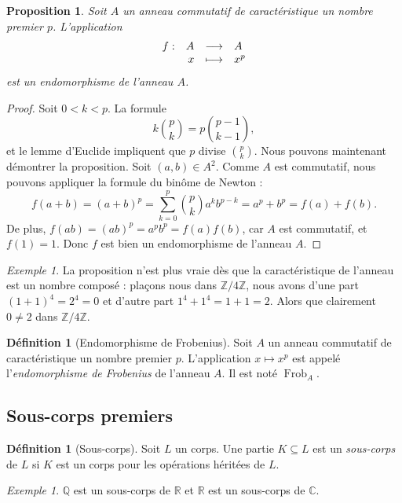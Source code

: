 \documentclass[a4paper, titlepage]{article}
\newtheorem{prop}[theo]{Proposition}
\theoremstyle{definition}
\newtheorem{defi}[theo]{Définition}
\theoremstyle{remark}
\newtheorem{exem}[theo]{Exemple}
\def\Z{\mathbb Z}
\def\Q{\mathbb Q}
\def\R{\mathbb R}
\def\C{\mathbb C}
\def\frob{\operatorname{Frob}}
\begin{document}
\begin{prop}\label{propFrob}
Soit $A$ un anneau commutatif de caractéristique un nombre premier $p$. L'application 
$$\begin{array}{r r c l}
 f :& A& \longrightarrow& A \\
 & x& \longmapsto& x^p
\end{array}$$
est un endomorphisme de l'anneau $A$.
\end{prop}

\begin{proof}
Soit $0 < k < p$. La formule 
$$k\binom{p}{k} = p\binom{p-1}{k-1},$$
et le lemme d'Euclide impliquent que $p$ divise $\binom{p}{k}$. Nous pouvons maintenant démontrer la proposition. Soit $(a,b) \in A^2$. Comme $A$ est commutatif, nous pouvons appliquer la formule du binôme de Newton :
$$f(a+b)=(a+b)^p = \sum_{k=0}^p \binom{p}{k} a^kb^{p-k} = a^p + b^p=f(a)+f(b).$$
De plus, $f(ab)=(ab)^p = a^pb^p=f(a)f(b)$, car $A$ est commutatif, et $f(1) = 1$. Donc $f$ est bien un endomorphisme de l'anneau $A$.
\end{proof}

\begin{exem}
La proposition n'est plus vraie dès que la caractéristique de l'anneau est un nombre composé : plaçons nous dans $\Z/4\Z$, nous avons d'une part $(1 + 1)^4 = 2^4 = 0$ et d'autre part $1^4 + 1^4 = 1+1 = 2$. Alors que clairement $0\neq 2$ dans $\Z/4\Z$.
\end{exem}

\begin{defi}[Endomorphisme de Frobenius]
Soit $A$ un anneau commutatif de caractéristique un nombre premier $p$. L'application $x \mapsto x^p$ est appelé l'\textit{endomorphisme de Frobenius} de l'anneau $A$. Il est noté $\frob_A$.
\end{defi}

\subsection{Sous-corps premiers}

\begin{defi}[Sous-corps]
Soit $L$ un corps. Une partie $K \subseteq L$ est un \textit{sous-corps} de $L$ si $K$ est un corps pour les opérations héritées de $L$.
\end{defi}

\begin{exem}
$\Q$ est un sous-corps de $\R$ et $\R$ est un sous-corps de $\C$.
\end{exem}
\end{document}
